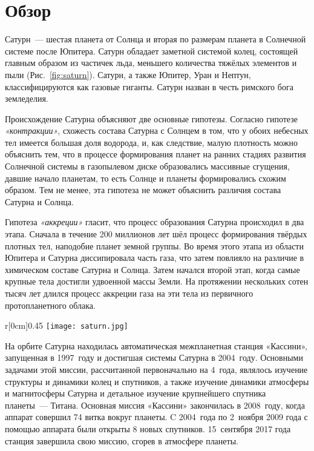 \documentclass{article}
\begin{document}
\section{Обзор}
    Сатурн~--- шестая планета от Солнца и вторая по размерам планета в Солнечной системе после Юпитера. Сатурн обладает заметной системой колец, состоящей главным образом из частичек льда, меньшего количества тяжёлых элементов и пыли (Рис.~\ref{fig:saturn}). Сатурн, а также Юпитер, Уран и Нептун, классифицируются как газовые гиганты. Сатурн назван в честь римского бога земледелия.\par
    Происхождение Сатурна объясняют две основные гипотезы. Согласно гипотезе \textit{«контракции»}, схожесть состава Сатурна с Солнцем в том, что у обоих небесных тел имеется большая доля водорода, и, как следствие, малую плотность можно объяснить тем, что в процессе формирования планет на ранних стадиях развития Солнечной системы в газопылевом диске образовались массивные сгущения, давшие начало планетам, то есть Солнце и планеты формировались схожим образом. Тем не менее, эта гипотеза не может объяснить различия состава Сатурна и Солнца.\par
    Гипотеза \textit{«аккреции»} гласит, что процесс образования Сатурна происходил в два этапа. Сначала в течение 200 миллионов лет шёл процесс формирования твёрдых плотных тел, наподобие планет земной группы. Во время этого этапа из области Юпитера и Сатурна диссипировала часть газа, что затем повлияло на различие в химическом составе Сатурна и Солнца. Затем начался второй этап, когда самые крупные тела достигли удвоенной массы Земли. На протяжении нескольких сотен тысяч лет длился процесс аккреции газа на эти тела из первичного протопланетного облака.\par
    \begin{wrapfigure}[11]{r}[0cm]{0.45\textwidth}
        \vspace{-1pc}
        \texttt{[image: saturn.jpg]}
        \caption{}
        \label{fig:saturn}
    \end{wrapfigure}
    На орбите Сатурна находилась автоматическая межпланетная станция «Кассини», запущенная в 1997~году и достигшая системы Сатурна в 2004~году. Основными задачами этой миссии, рассчитанной первоначально на 4~года, являлось изучение структуры и динамики колец и спутников, а также изучение динамики атмосферы и магнитосферы Сатурна и детальное изучение крупнейшего спутника планеты~--- Титана. Основная миссия «Кассини» закончилась в 2008~году, когда аппарат совершил 74 витка вокруг планеты. C 2004~года по 2~ноября 2009 года с помощью аппарата были открыты 8 новых спутников. 15~сентября 2017 года станция завершила свою миссию, сгорев в атмосфере планеты.\par
\end{document}
